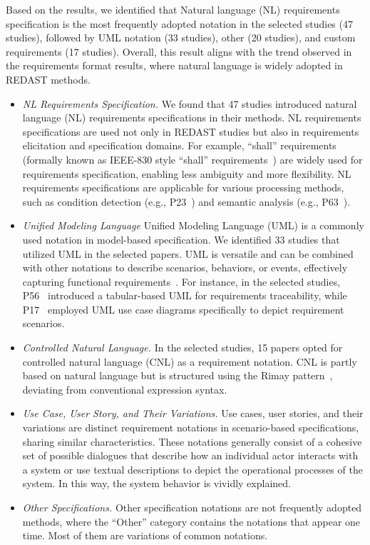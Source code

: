 Based on the results, we identified that Natural language (NL) requirements specification is the most frequently adopted notation in the selected studies (47 studies), followed by UML notation (33 studies), other (20 studies), and custom requirements (17 studies). Overall, this result aligns with the trend observed in the requirements format results, where natural language is widely adopted in REDAST methods.
\begin{itemize}
    \item \textit{NL Requirements Specification.} We found that 47 studies introduced natural language (NL) requirements specifications in their methods. NL requirements specifications are used not only in REDAST studies but also in requirements elicitation and specification domains. For example, “shall” requirements (formally known as IEEE-830 style “shall” requirements~\citep{ieee1998ieee}) are widely used for requirements specification, enabling less ambiguity and more flexibility. NL requirements specifications are applicable for various processing methods, such as condition detection (e.g., P23~) and semantic analysis (e.g., P63~).

    \item \textit{Unified Modeling Language} Unified Modeling Language (UML) is a commonly used notation in model-based specification. We identified 33 studies that utilized UML in the selected papers. UML is versatile and can be combined with other notations to describe scenarios, behaviors, or events, effectively capturing functional requirements~\cite{henderson2005uml}. For instance, in the selected studies, P56~ introduced a tabular-based UML for requirements traceability, while P17~ employed UML use case diagrams specifically to depict requirement scenarios.

    \item \textit{Controlled Natural Language.} In the selected studies, 15 papers opted for controlled natural language (CNL) as a requirement notation. CNL is partly based on natural language but is structured using the Rimay pattern~\cite{veizaga2021systematically}, deviating from conventional expression syntax.

    \item \textit{Use Case, User Story, and Their Variations.} Use cases, user stories, and their variations are distinct requirement notations in scenario-based specifications, sharing similar characteristics. These notations generally consist of a cohesive set of possible dialogues that describe how an individual actor interacts with a system or use textual descriptions to depict the operational processes of the system. In this way, the system behavior is vividly explained.

    \item \textit{Other Specifications.} Other specification notations are not frequently adopted methods, where the ``Other'' category contains the notations that appear one time. Most of them are variations of common notations.
\end{itemize}

